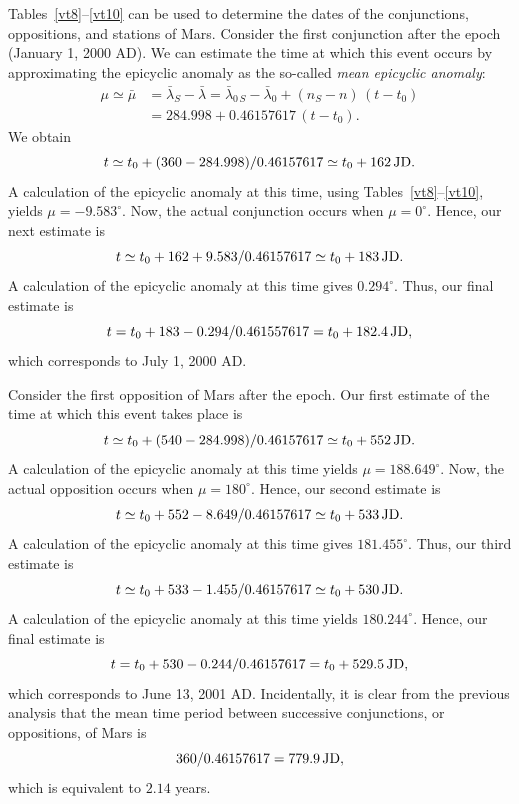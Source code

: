 Tables~\ref{vt8}--\ref{vt10} can be used to determine the dates of the conjunctions, oppositions, and
stations of Mars. Consider the first conjunction after the epoch (January 1, 2000 AD). We can estimate the
time at which this event occurs by approximating the epicyclic anomaly as the so-called
{\em mean epicyclic anomaly}: 
\begin{align*}
\mu \simeq \bar{\mu} &= \bar{\lambda}_S-\bar{\lambda} = \bar{\lambda}_{0\,S}-\bar{\lambda}_0 +(n_S-n)\,(t-t_0)\\[0.5ex]
& = 284.998 + 0.46157617\,(t-t_0).
\end{align*}
 We obtain
$$
t\simeq t_0 + (360-284.998)/0.46157617\simeq t_0 + 162\, {\rm JD}.
$$ 
A calculation of the epicyclic anomaly at this time, using Tables~\ref{vt8}--\ref{vt10}, yields $\mu=-9.583^\circ$. Now, the
actual conjunction occurs when $\mu=0^\circ$. Hence, our next estimate is 
$$
t\simeq t_0+162+9.583/0.46157617\simeq t_0 + 183\,{\rm JD}.
$$
A
calculation of the epicyclic anomaly at this time gives $0.294^\circ$. Thus, our final estimate is
$$
t=t_0 +183-0.294/0.461557617=t_0+182.4\, {\rm JD},
$$
which corresponds to July 1, 2000 AD.

Consider the first opposition of Mars after the epoch. Our first estimate of the time at which this
event takes place is 
$$
t\simeq t_0+(540-284.998)/0.46157617\simeq t_0 + 552\, {\rm JD}.
$$
A calculation of
the epicyclic anomaly at this time yields $\mu=188.649^\circ$. Now, the actual
opposition occurs when $\mu=180^\circ$. 
Hence, our second estimate is
$$
t\simeq t_0 +552-8.649/0.46157617\simeq t_0+533\,{\rm JD}.
$$
A calculation of the epicyclic anomaly
at this time  gives $181.455^\circ$. Thus, our third estimate is 
$$
t\simeq t_0+533-1.455/0.46157617 \simeq t_0+ 530\,{\rm JD}.
$$ A calculation of the epicyclic anomaly at this time yields $180.244^\circ$.
Hence, our final estimate is 
$$
t=t_0+530-0.244/0.46157617=t_0+529.5\,{\rm JD},
$$ 
which corresponds to
June 13, 2001 AD. Incidentally, it is clear from the previous analysis that the
mean  time period between successive conjunctions,  or  oppositions, of Mars is $$360/0.46157617= 779.9\, {\rm JD},$$ which is
equivalent to $2.14$ years.

